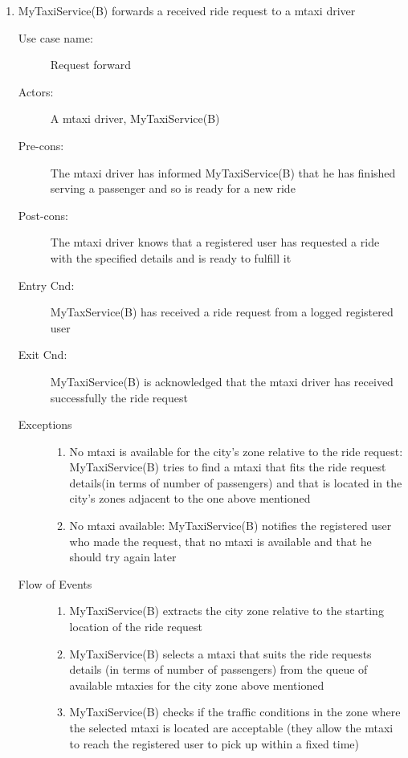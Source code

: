 \documentclass[11pt]{article} %
\begin{document}
\begin{enumerate}
	      \item  MyTaxiService(B) forwards a received ride request to a mtaxi driver
		\begin{description}
		        \item [Use case name:] Request forward
		        \item [Actors:] A mtaxi driver, MyTaxiService(B)
		        \item [Pre-cons:] The mtaxi driver has informed MyTaxiService(B) that he has finished serving a passenger and so is
		        ready for a new ride
		        \item [Post-cons:] The mtaxi driver knows that a registered user has requested a ride with the specified
		        details and is ready to fulfill it
		        \item [Entry Cnd:] MyTaxService(B) has received a ride request from a logged registered user
		        \item [Exit Cnd:] MyTaxiService(B) is acknowledged that the mtaxi driver has received successfully the ride request
		        \item [Exceptions]\hfill
			\begin{enumerate}
			          \item No mtaxi is available for the city's zone relative to the ride request: MyTaxiService(B) tries
			          to find a mtaxi that fits the ride request details(in terms of number of passengers) and that is located in the city's zones adjacent
			          to the one above mentioned
			          \item No mtaxi available: MyTaxiService(B) notifies the registered user who made the request, that
			          no mtaxi is available and that he should try again later
			\end{enumerate}
		        \item [Flow of Events]\hfill
			\begin{enumerate}
			          \item MyTaxiService(B) extracts the city zone relative to the starting location of the ride request
			          \item MyTaxiService(B) selects a mtaxi that suits the ride requests details (in terms of number of passengers) from the queue of available mtaxies
			            for the city zone above mentioned
			          \item MyTaxiService(B) checks if the traffic conditions in the zone where the selected mtaxi is located are acceptable
			          (they allow the mtaxi to reach the registered user to pick up within a fixed time)

\end{enumerate}
\end{description}
\end{enumerate}
\end{document}
